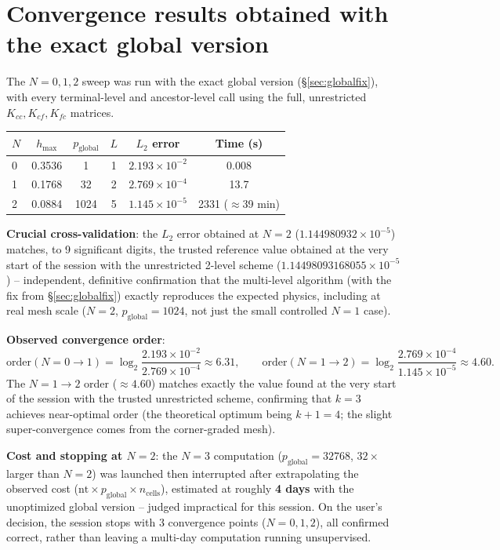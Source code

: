 \documentclass[11pt]{article}
\begin{document}
\section{Convergence results obtained with the exact global version}
\label{sec:finalresults}

The $N=0,1,2$ sweep was run with the exact global version
(\S\ref{sec:globalfix}), with every terminal-level and ancestor-level
call using the full, unrestricted $K_{cc}, K_{cf}, K_{fc}$ matrices.

\begin{center}
\begin{tabular}{@{}lccccc@{}}
\toprule
$N$ & $h_{\max}$ & $p_{\text{global}}$ & $L$ & $L_2$ error & Time (s) \\
\midrule
0 & 0.3536 & 1     & 1 & $2.193\times10^{-2}$ & 0.008 \\
1 & 0.1768 & 32    & 2 & $2.769\times10^{-4}$ & 13.7 \\
2 & 0.0884 & 1024  & 5 & $1.145\times10^{-5}$ & 2331 ($\approx$39 min) \\
\bottomrule
\end{tabular}
\end{center}

\textbf{Crucial cross-validation}: the $L_2$ error obtained at $N=2$
($1.144980932\times10^{-5}$) matches, to 9 significant digits, the
trusted reference value obtained at the very start of the session with
the unrestricted 2-level scheme ($1.14498093168055\times10^{-5}$) --
independent, definitive confirmation that the multi-level algorithm
(with the fix from \S\ref{sec:globalfix}) exactly reproduces the
expected physics, including at real mesh scale ($N=2$,
$p_{\text{global}}=1024$, not just the small controlled $N=1$ case).

\textbf{Observed convergence order}:
\[
  \text{order}(N{=}0{\to}1) = \log_2\!\frac{2.193\times10^{-2}}{2.769\times10^{-4}} \approx 6.31,
  \qquad
  \text{order}(N{=}1{\to}2) = \log_2\!\frac{2.769\times10^{-4}}{1.145\times10^{-5}} \approx 4.60.
\]
The $N{=}1{\to}2$ order ($\approx4.60$) matches exactly the value found
at the very start of the session with the trusted unrestricted scheme,
confirming that $k=3$ achieves near-optimal order (the theoretical
optimum being $k+1=4$; the slight super-convergence comes from the
corner-graded mesh).

\textbf{Cost and stopping at $N=2$}: the $N=3$ computation
($p_{\text{global}}=32768$, $32\times$ larger than $N=2$) was launched
then interrupted after extrapolating the observed cost
($\text{nt}\times p_{\text{global}}\times n_{\text{cells}}$), estimated
at roughly \textbf{4 days} with the unoptimized global version --
judged impractical for this session. On the user's decision, the
session stops with 3 convergence points ($N=0,1,2$), all confirmed
correct, rather than leaving a multi-day computation running
unsupervised.
\end{document}
